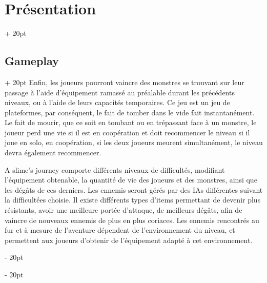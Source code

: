 \documentclass[a4paper, 12pt, twoside]{article}
\newcommand{\ind}[1][20pt]{\advance\leftskip + #1}
\newcommand{\deind}[1][20pt]{\advance\leftskip - #1}
\newenvironment{indt}[2][20pt]{#2 \par \ind[#1]}{\par \deind} %
\begin{document}
\begin{indt}{\section{Présentation}}
\begin{indt}{\subsection{Gameplay}}
            Enfin, les joueurs pourront vaincre des monstres se trouvant sur leur passage à l'aide d'équipement ramassé au préalable durant les précédents niveaux, ou à l'aide de leurs capacités temporaires. Ce jeu est un jeu de plateformes, par conséquent, le fait de tomber dans le vide fait instantanément. Le fait de mourir, que ce soit en tombant ou en trépassant face à un monstre, le joueur perd une vie si il est en coopération et doit recommencer le niveau si il joue en solo, en coopération, si les deux joueurs meurent simultanément, le niveau devra également recommencer.

            A slime's journey comporte différents niveaux de difficultés, modifiant l'équipement obtenable, la quantité de vie des joueurs et des monstres, ainsi que les dégâts de ces derniers. Les ennemis seront gérés par des IAs différentes suivant la difficultées choisie. Il existe différents types d'items permettant de devenir plus résistants, avoir une meilleure portée d'attaque, de meilleurs dégâts, afin de vaincre de nouveaux ennemis de plus en plus coriaces. Les ennemis rencontrés au fur et à mesure de l'aventure dépendent de l'environnement du niveau, et permettent aux joueurs d'obtenir de l'équipement adapté à cet environnement.
        \end{indt}
    \end{indt}

    \newpage
\end{document}
